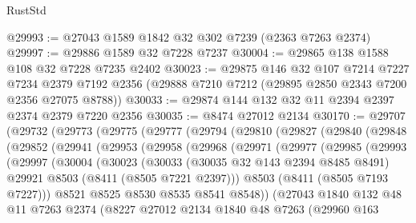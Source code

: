 \begin{lexlean}{RustStd}
\begin{coremodule}
@29993 := @27043 @1589 @1842 @32 @302 @7239 (@2363 @7263 @2374)
@29997 := @29886 @1589 @32 @7228 @7237
@30004 := @29865 @138 @1588 @108 @32 @7228 @7235 @2402
@30023 := @29875
    @146
    @32
    @107
    @7214
    @7227
    @7234
    @2379
    @7192
    @2356
    (@29888 @7210 @7212 (@29895 @2850 @2343 @7200 @2356 @27075 @8788))
@30033 := @29874 @144 @132 @32 @11 @2394 @2397 @2374 @2379 @7220 @2356
@30035 := @8474 @27012 @2134
@30170 := @29707
    (@29732
      (@29773
        (@29775
          (@29777
            (@29794
              (@29810
                (@29827
                  (@29840
                    (@29848
                      (@29852
                        (@29941
                          (@29953
                            (@29958
                              (@29968
                                (@29971
                                  (@29977
                                    (@29985
                                      (@29993
                                        (@29997
                                          (@30004
                                            (@30023
                                              (@30033
                                                (@30035 @32 @143 @2394 @8485 @8491)
                                                @29921
                                                @8503
                                                (@8411 (@8505 @7221 @2397)))
                                              @8503
                                              (@8411 (@8505 @7193 @7227)))
                                            @8521
                                            @8525
                                            @8530
                                            @8535
                                            @8541
                                            @8548))
                                        (@27043
                                          @1840
                                          @132
                                          @48
                                          @11
                                          @7263
                                          @2374
                                          (@8227
                                            @27012
                                            @2134
                                            @1840
                                            @48
                                            @7263
                                            (@29960
                                              @163

\end{coremodule}
\end{lexlean}
